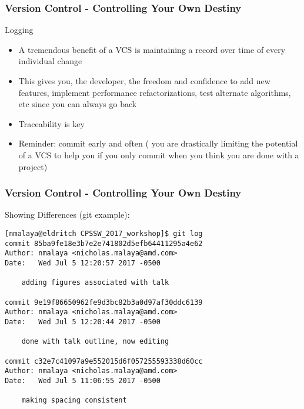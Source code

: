 \documentclass[mathserif]{beamer}
\begin{document}
\begin{frame}
\frametitle{Version Control - Controlling Your Own Destiny}
\begin{block}{Logging}
\begin{itemize}
\item A tremendous benefit of a VCS is maintaining a record over time
  of every individual change
\item This gives you, the developer, the freedom and confidence to
  add new features, implement performance refactorizations, test alternate
  algorithms, etc since you can always go back
\item Traceability is key
\item Reminder: commit early and often ({\color{pecos2} you are drastically limiting the
  potential of a VCS to help you if you only commit when you think you
  are done with a project})
\end{itemize}
\end{block}
\end{frame}

%
%
\begin{frame}[fragile]
\frametitle{Version Control - Controlling Your Own Destiny}

\begin{block}{Showing Differences (git example):}
\begin{scriptsize}
\begin{verbatim}
[nmalaya@eldritch CPSSW_2017_workshop]$ git log
commit 85ba9fe18e3b7e2e741802d5efb64411295a4e62
Author: nmalaya <nicholas.malaya@amd.com>
Date:   Wed Jul 5 12:20:57 2017 -0500

    adding figures associated with talk

commit 9e19f86650962fe9d3bc82b3a0d97af30ddc6139
Author: nmalaya <nicholas.malaya@amd.com>
Date:   Wed Jul 5 12:20:44 2017 -0500

    done with talk outline, now editing

commit c32e7c41097a9e552015d6f057255593338d60cc
Author: nmalaya <nicholas.malaya@amd.com>
Date:   Wed Jul 5 11:06:55 2017 -0500

    making spacing consistent
\end{verbatim}
\end{scriptsize}
\end{block}
\end{frame}
\end{document}
